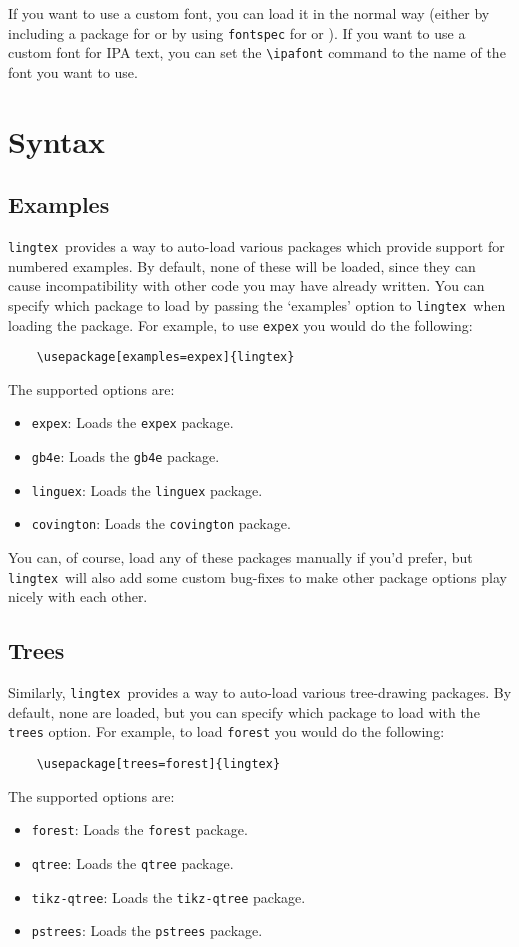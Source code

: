 \documentclass{article}
\def\lingtex{\texttt{lingtex}}
\begin{document}
If you want to use a custom font, you can load it in the normal way (either by including a package for  or by using \verb|fontspec| for  or ). If you want to use a custom font for IPA text, you can set the \verb|\ipafont| command to the name of the font you want to use.

\section{Syntax} \label{sec:syntax}

\subsection{Examples} \label{ssec:examples}

\lingtex\ provides a way to auto-load various packages which provide support for numbered examples. By default, none of these will be loaded, since they can cause incompatibility with other code you may have already written. You can specify which package to load by passing the `examples' option to \lingtex\ when loading the package. For example, to use \texttt{expex} you would do the following:
\begin{verbatim}
    \usepackage[examples=expex]{lingtex}
\end{verbatim}
The supported options are:
\begin{itemize}
	\item \verb|expex|: Loads the \texttt{expex} package.
	\item \verb|gb4e|: Loads the \texttt{gb4e} package.
	\item \verb|linguex|: Loads the \texttt{linguex} package.
	\item \verb|covington|: Loads the \texttt{covington} package.
\end{itemize}
You can, of course, load any of these packages manually if you'd prefer, but \lingtex\ will also add some custom bug-fixes to make other package options play nicely with each other.

\subsection{Trees} \label{ssec:trees}

Similarly, \lingtex\ provides a way to auto-load various tree-drawing packages. By default, none are loaded, but you can specify which package to load with the \verb|trees| option. For example, to load \texttt{forest} you would do the following:
\begin{verbatim}
    \usepackage[trees=forest]{lingtex}
\end{verbatim}
The supported options are:
\begin{itemize}
	\item \verb|forest|: Loads the \texttt{forest} package.
	\item \verb|qtree|: Loads the \texttt{qtree} package.
	\item \verb|tikz-qtree|: Loads the \texttt{tikz-qtree} package.
	\item \verb|pstrees|: Loads the \texttt{pstrees} package.
\end{itemize}
\end{document}
